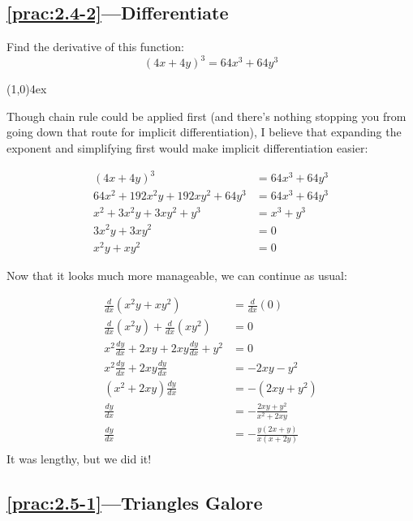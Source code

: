 \documentclass{MathNotes}
\newcommand{\br}{
\begin{center}
\line(1,0){4ex}
\end{center}}
\begin{document}
\newpage
\subsection*{\ref{prac:2.4-2}---Differentiate}\label{ans:2.4-2}
Find the derivative of this function: $$(4x+4y)^3=64x^3+64y^3$$
\br
Though chain rule could be applied first (and there's nothing stopping you from
going down that route for implicit differentiation), I believe that expanding
the exponent and simplifying first would make implicit differentiation easier:

\begin{align*}
    (4x+4y)^3&=64x^3+64y^3\\
    64x^2+192x^2y+192xy^2+64y^3&=64x^3+64y^3\\
    x^2+3x^2y+3xy^2+y^3&=x^3+y^3\\
    3x^2y+3xy^2&=0\\
    x^2y+xy^2&=0
\end{align*}

Now that it looks much more manageable, we can continue as usual:

\begin{align*}
    \frac{d}{dx}(x^2y+xy^2)&=\frac{d}{dx}(0)\\
    \frac{d}{dx}(x^2y)+\frac{d}{dx}(xy^2)&=0\\
    x^2\frac{dy}{dx}+2xy+2xy\frac{dy}{dx}+y^2&=0\\
    x^2\frac{dy}{dx}+2xy\frac{dy}{dx}&=-2xy-y^2\\
    (x^2+2xy)\frac{dy}{dx}&=-(2xy+y^2)\\
    \frac{dy}{dx}&=-\frac{2xy+y^2}{x^2+2xy}\\
    \frac{dy}{dx}&=-\frac{y(2x+y)}{x(x+2y)}\\
\end{align*}
It was lengthy, but we did it!
\subsection*{\ref{prac:2.5-1}---Triangles Galore}\label{ans:2.5-1}

\end{document}
